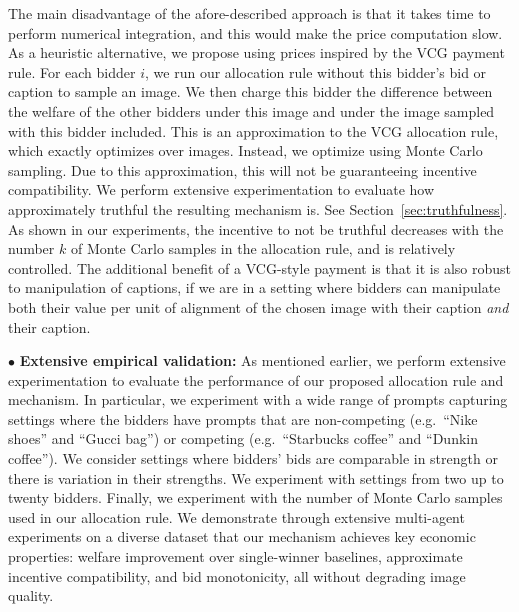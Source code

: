 \documentclass[format=acmsmall, review=false]{acmart}
\begin{document}
    
    \smallskip \noindent The main disadvantage of the afore-described approach is that it takes time to perform numerical integration, and this would make the price computation slow. As a heuristic alternative, we propose using prices inspired by the VCG payment rule. For each bidder $i$, we run our allocation rule without this bidder's bid or caption to sample an image. We then charge this bidder the difference between the welfare of the other bidders  under this image and under the image sampled with this bidder included. This is an approximation to the VCG allocation rule, which exactly optimizes  over images. Instead, we optimize using Monte Carlo sampling. Due to this approximation, 
    this will not be guaranteeing incentive compatibility. We perform extensive experimentation to evaluate how approximately truthful the resulting mechanism is. See Section~\ref{sec:truthfulness}. As shown in our experiments, the incentive to not be truthful decreases with the number $k$ of Monte Carlo samples in the allocation rule, and is relatively controlled. The additional benefit of a VCG-style payment is that it is also robust to manipulation of captions, if we are in a setting where bidders can manipulate both their value per unit of alignment of the chosen image with their caption {\em and} their caption. 

 \smallskip \noindent  $\bullet$ \textbf{Extensive empirical validation:} As mentioned earlier, we perform extensive experimentation to evaluate the performance of our proposed allocation rule and mechanism. In particular, we experiment with a wide range of prompts capturing settings where the bidders have prompts that are non-competing (e.g.~``Nike shoes'' and ``Gucci bag'') or competing (e.g.~``Starbucks coffee'' and ``Dunkin coffee''). We consider settings where bidders' bids are comparable in strength or there is  variation in their strengths. We experiment with settings from two up to twenty bidders. Finally, we experiment with the number of Monte Carlo samples used in our allocation rule.  We demonstrate through extensive multi-agent experiments on a diverse dataset that our mechanism achieves key economic properties: welfare improvement over single-winner baselines, approximate incentive compatibility, and bid monotonicity, all without degrading image quality. 
 
\end{document}
